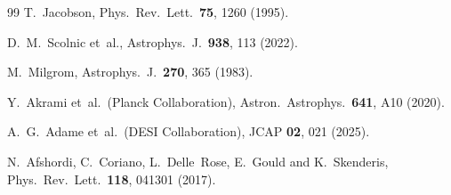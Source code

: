 \documentclass[aps,prd,twocolumn,superscriptaddress,nofootinbib]{revtex4-2}
\begin{document}
\begin{thebibliography}{99}
T.~Jacobson,
Phys.\ Rev.\ Lett.\ \textbf{75}, 1260 (1995).

D.~M.~Scolnic et~al.,
Astrophys.\ J.\ \textbf{938}, 113 (2022).

M.~Milgrom,
Astrophys.\ J.\ \textbf{270}, 365 (1983).

Y.~Akrami et~al.\ (Planck Collaboration),
Astron.\ Astrophys.\ \textbf{641}, A10 (2020).

A.~G.~Adame et~al.\ (DESI Collaboration),
JCAP \textbf{02}, 021 (2025).

N.~Afshordi, C.~Coriano, L.~Delle~Rose, E.~Gould and K.~Skenderis,
Phys.\ Rev.\ Lett.\ \textbf{118}, 041301 (2017).

\end{thebibliography}
\end{document}
